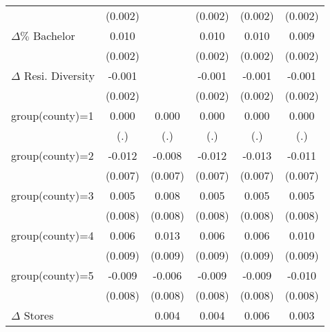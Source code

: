 {\begin{tabular}{l*{5}{c}}
                    &     (0.002)         &                     &     (0.002)         &     (0.002)         &     (0.002)         \\
$\Delta \%$ Bachelor&       0.010\sym{***}&                     &       0.010\sym{***}&       0.010\sym{***}&       0.009\sym{***}\\
                    &     (0.002)         &                     &     (0.002)         &     (0.002)         &     (0.002)         \\
$\Delta$ Resi. Diversity&      -0.001         &                     &      -0.001         &      -0.001         &      -0.001         \\
                    &     (0.002)         &                     &     (0.002)         &     (0.002)         &     (0.002)         \\
group(county)=1     &       0.000         &       0.000         &       0.000         &       0.000         &       0.000         \\
                    &         (.)         &         (.)         &         (.)         &         (.)         &         (.)         \\
group(county)=2     &      -0.012\sym{*}  &      -0.008         &      -0.012\sym{*}  &      -0.013\sym{*}  &      -0.011         \\
                    &     (0.007)         &     (0.007)         &     (0.007)         &     (0.007)         &     (0.007)         \\
group(county)=3     &       0.005         &       0.008         &       0.005         &       0.005         &       0.005         \\
                    &     (0.008)         &     (0.008)         &     (0.008)         &     (0.008)         &     (0.008)         \\
group(county)=4     &       0.006         &       0.013         &       0.006         &       0.006         &       0.010         \\
                    &     (0.009)         &     (0.009)         &     (0.009)         &     (0.009)         &     (0.009)         \\
group(county)=5     &      -0.009         &      -0.006         &      -0.009         &      -0.009         &      -0.010         \\
                    &     (0.008)         &     (0.008)         &     (0.008)         &     (0.008)         &     (0.008)         \\
$\Delta$ Stores     &                     &       0.004\sym{**} &       0.004\sym{**} &       0.006\sym{***}&       0.003\sym{**} \\

\end{tabular}}

